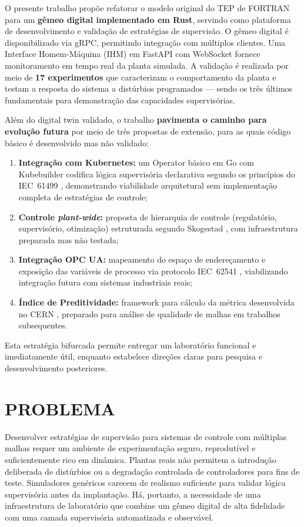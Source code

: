 O presente trabalho propõe refatorar o modelo original do TEP de FORTRAN para um \textbf{gêmeo digital implementado em Rust}, servindo como plataforma de desenvolvimento e validação de estratégias de supervisão. O gêmeo digital é disponibilizado via gRPC, permitindo integração com múltiplos clientes. Uma Interface Homem-Máquina (IHM) em FastAPI com WebSocket fornece monitoramento em tempo real da planta simulada. A validação é realizada por meio de \textbf{17 experimentos} que caracterizam o comportamento da planta e testam a resposta do sistema a distúrbios programados — sendo os três últimos fundamentais para demonstração das capacidades supervisórias.

Além do digital twin validado, o trabalho \textbf{pavimenta o caminho para evolução futura} por meio de três propostas de extensão, para as quais código básico é desenvolvido mas não validado:
\begin{enumerate}
  \item \textbf{Integração com Kubernetes:} um Operator básico em Go com Kubebuilder codifica lógica supervisória declarativa segundo os princípios do IEC~61499 \cite{IEC61499}, demonstrando viabilidade arquitetural sem implementação completa de estratégias de controle;
  \item \textbf{Controle \textit{plant-wide}:} proposta de hierarquia de controle (regulatório, supervisório, otimização) estruturada segundo Skogestad \cite{Skogestad2004}, com infraestrutura preparada mas não testada;
  \item \textbf{Integração OPC UA:} mapeamento do espaço de endereçamento e exposição das variáveis de processo via protocolo IEC~62541 \cite{IEC62541_1}, viabilizando integração futura com sistemas industriais reais;
  \item \textbf{Índice de Preditividade:} framework para cálculo da métrica desenvolvida no CERN \cite{Bradu2018}, preparado para análise de qualidade de malhas em trabalhos subsequentes.
\end{enumerate}

Esta estratégia bifurcada permite entregar um laboratório funcional e imediatamente útil, enquanto estabelece direções claras para pesquisa e desenvolvimento posteriores.


\section{PROBLEMA}
\label{sec:problema}

Desenvolver estratégias de supervisão para sistemas de controle com múltiplas malhas requer um ambiente de experimentação seguro, reprodutível e suficientemente rico em dinâmica. Plantas reais não permitem a introdução deliberada de distúrbios ou a degradação controlada de controladores para fins de teste. Simuladores genéricos carecem de realismo suficiente para validar lógica supervisória antes da implantação. Há, portanto, a necessidade de uma infraestrutura de laboratório que combine um gêmeo digital de alta fidelidade com uma camada supervisória automatizada e observável.

